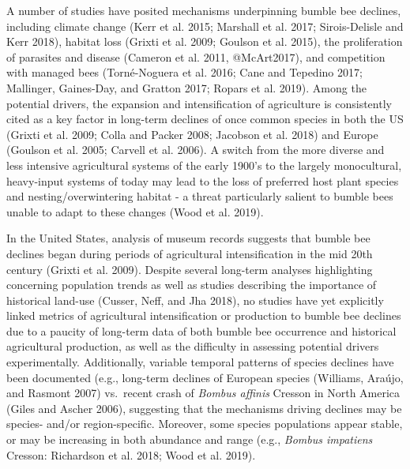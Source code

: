 \documentclass[11pt,]{article}
\begin{document}
A number of studies have posited mechanisms underpinning bumble bee
declines, including climate change (Kerr et al. 2015; Marshall et al.
2017; Sirois-Delisle and Kerr 2018), habitat loss (Grixti et al. 2009;
Goulson et al. 2015), the proliferation of parasites and disease
(Cameron et al. 2011, @McArt2017), and competition with managed bees
(Torné-Noguera et al. 2016; Cane and Tepedino 2017; Mallinger,
Gaines-Day, and Gratton 2017; Ropars et al. 2019). Among the potential
drivers, the expansion and intensification of agriculture is
consistently cited as a key factor in long-term declines of once common
species in both the US (Grixti et al. 2009; Colla and Packer 2008;
Jacobson et al. 2018) and Europe (Goulson et al. 2005; Carvell et al.
2006). A switch from the more diverse and less intensive agricultural
systems of the early 1900's to the largely monocultural, heavy-input
systems of today may lead to the loss of preferred host plant species
and nesting/overwintering habitat - a threat particularly salient to
bumble bees unable to adapt to these changes (Wood et al. 2019).

In the United States, analysis of museum records suggests that bumble
bee declines began during periods of agricultural intensification in the
mid 20th century (Grixti et al. 2009). Despite several long-term
analyses highlighting concerning population trends as well as studies
describing the importance of historical land-use (Cusser, Neff, and Jha
2018), no studies have yet explicitly linked metrics of agricultural
intensification or production to bumble bee declines due to a paucity of
long-term data of both bumble bee occurrence and historical agricultural
production, as well as the difficulty in assessing potential drivers
experimentally. Additionally, variable temporal patterns of species
declines have been documented (e.g., long-term declines of European
species (Williams, Araújo, and Rasmont 2007) vs.~recent crash of
\emph{Bombus affinis} Cresson in North America (Giles and Ascher 2006),
suggesting that the mechanisms driving declines may be species- and/or
region-specific. Moreover, some species populations appear stable, or
may be increasing in both abundance and range (e.g., \emph{Bombus
impatiens} Cresson: Richardson et al. 2018; Wood et al. 2019).
\end{document}
